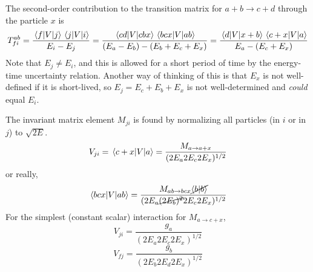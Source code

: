 \documentclass[a4paper,twoside,master.tex]{subfiles}
\begin{document}

The second-order contribution to the transition matrix for $ a + b \to c + d $ through the particle $ x $ is
\begin{equation}
    T^{ab}_{fi} = \frac{\mel{f}{V}{j} \mel{j}{V}{i}}{E_i - E_j} = \frac{\mel{cd}{V}{cbx} \mel{bcx}{V}{ab}}{(E_a - E_b) - (E_b + E_c + E_x)} = \frac{\mel{d}{V}{x+b} \mel{c+x}{V}{a}}{E_a - (E_c + E_x)}
\end{equation}
Note that $ E_j \neq E_i $, and this is allowed for a short period of time by the energy-time uncertainty relation. Another way of thinking of this is that $ E_x $ is not well-defined if it is short-lived, so $ E_j = E_c + E_b + E_x $ is not well-determined and \textit{could} equal $ E_i $.

The invariant matrix element $ M_{ji} $ is found by normalizing all particles (in $ i $ or in $ j $) to $ \sqrt{2E} $.
\begin{equation}
    V_{ji} = \mel{c+x}{V}{a} = \frac{M_{a \to a+x}}{(2 E_a 2 E_c 2 E_x)^{1/2}}
\end{equation}
or really,
\begin{equation}
    \mel{bcx}{V}{ab} = \frac{M_{ab \to bcx}\cancel{\bra{b}\ket{b}}}{(2E_a \cancel{(2 E_b)^2} 2E_c 2E_x)^{1/2}}
\end{equation}
For the simplest (constant scalar) interaction for $ M_{a \to c+x} $,
\begin{equation}
    V_{ji} = \frac{g_a}{(2E_a 2 E_c 2 E_x)^{1/2}}
\end{equation}
\begin{equation}
    V_{fj} = \frac{g_b}{(2 E_b 2 E_d 2 E_x)^{1/2}}
\end{equation}
\end{document}
